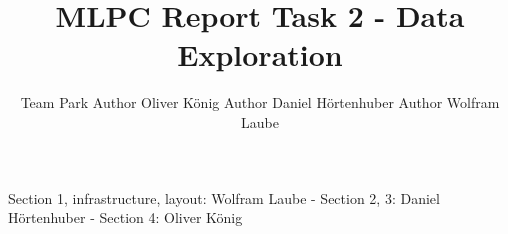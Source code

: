 \documentclass{article}
\title{MLPC Report Task 2 - Data Exploration}
\author{%
  Team Park \AND
  Author Oliver König
  \And
  Author Daniel Hörtenhuber
  \And 
  Author Wolfram Laube
}
\begin{document}
\maketitle


\begin{contributions}
  Section 1, infrastructure, layout: Wolfram Laube - Section 2, 3: Daniel Hörtenhuber - Section 4: Oliver König
\end{contributions}








\end{document}
